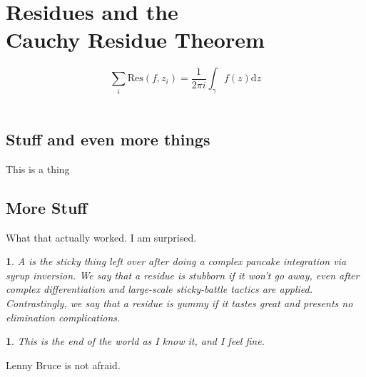 \documentclass[10pt]{article}
\theoremstyle{marginlab}
\newtheorem{margindef}{\color{accol}{Definition}}
\numberwithin{margindef}{section}
\theoremstyle{marginlab}
\newtheorem{marginthm}{\color{accol}{Theorem}}
\numberwithin{marginthm}{section}
\begin{document}
\section{Residues and the\\Cauchy Residue Theorem}
\lipsum[2]

\begin{equation}
\sum_i  \mathrm{Res}\left(f, z_i\right) = \frac{1}{2\pi i} \int_\gamma f(z) \mathrm{d}z
\end{equation}
\lipsum[1]\\

\subsection{Stuff and even more things} This is a thing
\subsection{More Stuff}

What that actually worked. I am surprised. \lipsum[1]
\begin{margindef}
A {\color{accol}{residue}} is the sticky thing left over after doing a complex pancake integration via syrup inversion.
We say that a residue is stubborn if it won't go away, even after complex differentiation and large-scale sticky-battle tactics are applied. Contrastingly, we say that a residue is yummy if it tastes great and presents no elimination complications.
\end{margindef}

\begin{marginthm}
	This is the end of the world as I know it, and I feel fine.
\end{marginthm}

Lenny Bruce is not afraid. \lipsum[8]
\end{document}
